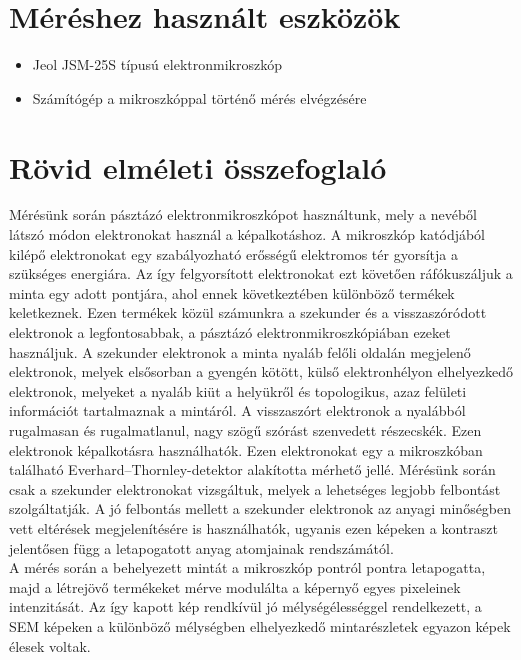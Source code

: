 \documentclass[12pt,a4paper]{article}
\begin{document}
\section{Méréshez használt eszközök}
\begin{itemize}
\item{Jeol JSM-25S típusú elektronmikroszkóp}
\item{Számítógép a mikroszkóppal történő mérés elvégzésére}
\end{itemize}

\section{Rövid elméleti összefoglaló}
\hspace*{10pt} Mérésünk során pásztázó elektronmikroszkópot használtunk, mely a nevéből látszó módon elektronokat használ a képalkotáshoz. A mikroszkóp katódjából kilépő elektronokat egy szabályozható erősségű elektromos tér gyorsítja a szükséges energiára. Az így felgyorsított elektronokat ezt követően ráfókuszáljuk a minta egy adott pontjára, ahol ennek következtében különböző termékek keletkeznek. Ezen termékek közül számunkra a szekunder és a visszaszóródott elektronok a legfontosabbak, a pásztázó elektronmikroszkópiában ezeket használjuk. A szekunder elektronok a minta nyaláb felőli oldalán megjelenő elektronok, melyek elsősorban a gyengén kötött, külső elektronhélyon elhelyezkedő elektronok, melyeket a nyaláb kiüt a helyükről és topologikus, azaz felületi információt tartalmaznak a mintáról. A visszaszórt elektronok a nyalábból rugalmasan és rugalmatlanul, nagy szögű szórást szenvedett részecskék. Ezen elektronok képalkotásra használhatók. Ezen elektronokat egy a mikroszkóban található Everhard--Thornley-detektor alakította mérhető jellé. Mérésünk során csak a szekunder elektronokat vizsgáltuk, melyek a lehetséges legjobb felbontást szolgáltatják. A jó felbontás mellett a szekunder elektronok az anyagi minőségben vett eltérések megjelenítésére is használhatók, ugyanis ezen képeken a kontraszt jelentősen függ a letapogatott anyag atomjainak rendszámától.\\
\hspace*{10pt} A mérés során a behelyezett mintát a mikroszkóp pontról pontra letapogatta, majd a létrejövő termékeket mérve modulálta a képernyő egyes pixeleinek intenzitását. Az így kapott kép rendkívül jó mélységélességgel rendelkezett, a SEM képeken a különböző mélységben elhelyezkedő mintarészletek egyazon képek élesek voltak. 
\newpage
\end{document}
